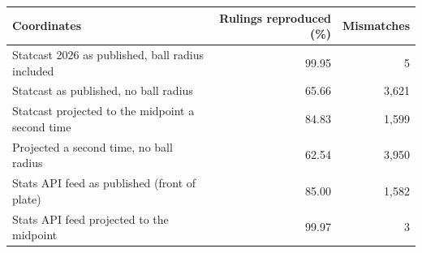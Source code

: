 \begin{tabular}{lrr}
\toprule
Coordinates & Rulings reproduced (\%) & Mismatches \\
\midrule
Statcast 2026 as published, ball radius included & 99.95 & 5 \\
Statcast as published, no ball radius & 65.66 & 3{,}621 \\
Statcast projected to the midpoint a second time & 84.83 & 1{,}599 \\
Projected a second time, no ball radius & 62.54 & 3{,}950 \\
Stats API feed as published (front of plate) & 85.00 & 1{,}582 \\
Stats API feed projected to the midpoint & 99.97 & 3 \\
\bottomrule
\end{tabular}
